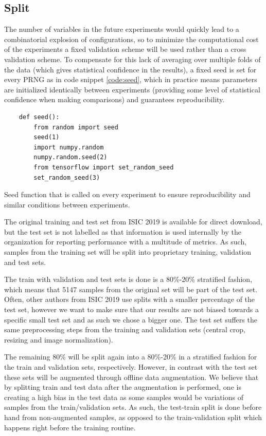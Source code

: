 \subsection{Split}
\label{subsection:split}
    The number of variables in the future experiments would quickly lead to a combinatorial explosion of configurations, so to minimize the computational cost of the experiments a fixed validation scheme will be used rather than a cross validation scheme. To compensate for this lack of averaging over multiple folds of the data (which gives statistical confidence in the results), a fixed seed is set for every \ac{PRNG} as in code snippet \ref{code:seed}, which in practice means parameters are initialized identically between experiments (providing some level of statistical confidence when making comparisons) and guarantees reproducibility.
    
    \begin{listing}[ht]
    \begin{verbatim}
    def seed():
        from random import seed
        seed(1)
        import numpy.random
        numpy.random.seed(2)
        from tensorflow import set_random_seed
        set_random_seed(3)
    \end{verbatim}
    \caption{Seed function that is called on every experiment to ensure reproducibility and similar conditions between experiments.}
    \label{code:seed}
    \end{listing}
    
    The original training and test set from \ac{ISIC} 2019 is available for direct download, but the test set is not labelled as that information is used internally by the organization for reporting performance with a multitude of metrics. As such, samples from the training set will be split into proprietary training, validation and test sets. \par
    
    The train with validation and test sets is done is a 80\%-20\% stratified fashion, which means that 5147 samples from the original set will be part of the test set. Often, other authors from ISIC 2019 use splits with a smaller percentage of the test set, however we want to make sure that our results are not biased towards a specific small test set and as such we chose a bigger one. The test set suffers the same preprocessing steps from the training and validation sets (central crop, resizing and image normalization). \par 
    
    The remaining 80\% will be split again into a 80\%-20\% in a stratified fashion for the train and validation sets, respectively.  However, in contrast with the test set these sets will be augmented through offline data augmentation. We believe that by splitting train and test data after the augmentation is performed, one is creating a high bias in the test data as some samples would be variations of samples from the train/validation sets. As such, the test-train split is done before hand from non-augmented samples, as opposed to the train-validation split which happens right before the training routine. \par

